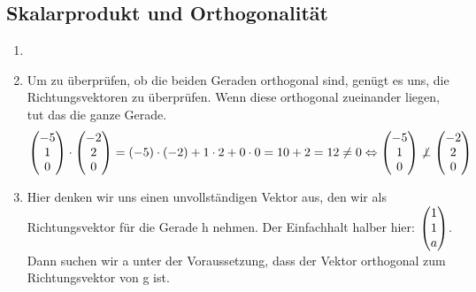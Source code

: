 	\subsection{Skalarprodukt und Orthogonalität}	 
	\begin{enumerate}
 		\item \hfill
 		
 		\item Um zu überprüfen, ob die beiden Geraden orthogonal sind, genügt es uns, die Richtungsvektoren zu überprüfen. Wenn diese orthogonal zueinander liegen, tut das die ganze Gerade.
 		$$ \begin{pmatrix} -5 \\ 1 \\ 0 \end{pmatrix} \cdot \begin{pmatrix} -2 \\ 2 \\ 0 \end{pmatrix} = (-5)\cdot(-2)+1\cdot2+0\cdot0=10+2=12 \not = 0 \Leftrightarrow \begin{pmatrix} -5 \\ 1 \\ 0 \end{pmatrix} \not \perp \begin{pmatrix} -2 \\ 2 \\ 0 \end{pmatrix} $$ 		
 		
 		\item Hier denken wir uns einen unvollständigen Vektor aus, den wir als Richtungsvektor für die Gerade h nehmen. Der Einfachhalt halber hier: $\begin{pmatrix} 1 \\ 1 \\ a \end{pmatrix}$.
 		Dann suchen wir a unter der Voraussetzung, dass der Vektor orthogonal zum Richtungsvektor von g ist.
 			

\end{enumerate}
